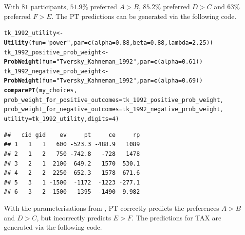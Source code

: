\documentclass{article}\usepackage[]{graphicx}\usepackage[]{color}
\makeatletter
\newcommand{\hlnum}[1]{\textcolor[rgb]{0.686,0.059,0.569}{#1}}%
\newcommand{\hlstr}[1]{\textcolor[rgb]{0.192,0.494,0.8}{#1}}%
\newcommand{\hlstd}[1]{\textcolor[rgb]{0.345,0.345,0.345}{#1}}%
\newcommand{\hlkwb}[1]{\textcolor[rgb]{0.69,0.353,0.396}{#1}}%
\newcommand{\hlkwc}[1]{\textcolor[rgb]{0.333,0.667,0.333}{#1}}%
\newcommand{\hlkwd}[1]{\textcolor[rgb]{0.737,0.353,0.396}{\textbf{#1}}}%
\newenvironment{kframe}{%
 \def\at@end@of@kframe{}%
 \ifinner\ifhmode%
  \def\at@end@of@kframe{\end{minipage}}%
  \begin{minipage}{\columnwidth}%
 \fi\fi%
 \def\FrameCommand##1{\hskip\@totalleftmargin \hskip-\fboxsep
 \colorbox{shadecolor}{##1}\hskip-\fboxsep
     \hskip-\linewidth \hskip-\@totalleftmargin \hskip\columnwidth}%
 \MakeFramed {\advance\hsize-\width
   \@totalleftmargin\z@ \linewidth\hsize
   \@setminipage}}%
 {\par\unskip\endMakeFramed%
 \at@end@of@kframe}
\newenvironment{knitrout}{}{} %
\makeatother
\begin{document}
\begin{knitrout}
{}



\end{knitrout}


With $81$ participants, $51.9\%$ preferred $A > B$, $85.2\%$ preferred $D > C$ and $63\%$ preferred $F > E$. The PT predictions can be generated via the following code.

\begin{knitrout}
\color{fgcolor}\begin{kframe}
\begin{alltt}
\hlstd{tk_1992_utility} \hlkwb{<-} \hlkwd{Utility}\hlstd{(}\hlkwc{fun}\hlstd{=}\hlstr{"power"}\hlstd{,} \hlkwc{par}\hlstd{=}\hlkwd{c}\hlstd{(}\hlkwc{alpha}\hlstd{=}\hlnum{0.88}\hlstd{,} \hlkwc{beta}\hlstd{=}\hlnum{0.88}\hlstd{,} \hlkwc{lambda}\hlstd{=}\hlnum{2.25}\hlstd{))}
\hlstd{tk_1992_positive_prob_weight} \hlkwb{<-} \hlkwd{ProbWeight}\hlstd{(}\hlkwc{fun}\hlstd{=}\hlstr{"Tversky_Kahneman_1992"}\hlstd{,} \hlkwc{par}\hlstd{=}\hlkwd{c}\hlstd{(}\hlkwc{alpha}\hlstd{=}\hlnum{0.61}\hlstd{))}
\hlstd{tk_1992_negative_prob_weight} \hlkwb{<-} \hlkwd{ProbWeight}\hlstd{(}\hlkwc{fun}\hlstd{=}\hlstr{"Tversky_Kahneman_1992"}\hlstd{,} \hlkwc{par}\hlstd{=}\hlkwd{c}\hlstd{(}\hlkwc{alpha}\hlstd{=}\hlnum{0.69}\hlstd{))}
\hlkwd{comparePT}\hlstd{(my_choices,}
        \hlkwc{prob_weight_for_positive_outcomes}\hlstd{=tk_1992_positive_prob_weight,}
        \hlkwc{prob_weight_for_negative_outcomes}\hlstd{=tk_1992_negative_prob_weight,}
        \hlkwc{utility}\hlstd{=tk_1992_utility,} \hlkwc{digits}\hlstd{=}\hlnum{4}\hlstd{)}
\end{alltt}
\begin{verbatim}
##   cid gid    ev     pt     ce     rp
## 1   1   1   600 -523.3 -488.9   1089
## 2   1   2   750 -742.8   -728   1478
## 3   2   1  2100  649.2   1570  530.1
## 4   2   2  2250  652.3   1578  671.6
## 5   3   1 -1500  -1172  -1223 -277.1
## 6   3   2 -1500  -1395  -1490 -9.982
\end{verbatim}
\end{kframe}
\end{knitrout}


With the parameterisations from \cite{Tversky_Kahneman_1992}, PT correctly predicts the preferences $A > B$ and $D > C$, but incorrectly predicts $E > F$.
The predictions for TAX are generated via the following code.
\end{document}
